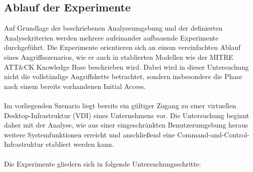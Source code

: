 \subsection{Ablauf der Experimente}
Auf Grundlage der beschriebenen Analyseumgebung und der definierten Analysekriterien werden mehrere aufeinander aufbauende Experimente durchgeführt. 
Die Experimente orientieren sich an einem vereinfachten Ablauf eines Angriffsszenarios, wie er auch in etablierten Modellen wie der MITRE ATT\&CK Knowledge Base beschrieben wird. 
Dabei wird in dieser Untersuchung nicht die vollständige Angriffskette betrachtet, sondern insbesondere die Phase nach einem bereits vorhandenen Initial Access.
\\\\
Im vorliegenden Szenario liegt bereits ein gültiger Zugang zu einer virtuellen Desktop-Infrastruktur (VDI) eines Unternehmens vor. 
Die Untersuchung beginnt daher mit der Analyse, wie aus einer eingeschränkten Benutzerumgebung heraus weitere Systemfunktionen erreicht und anschließend eine Command-and-Control-Infrastruktur etabliert werden kann.
\\\\
Die Experimente gliedern sich in folgende Untersuchungsschritte:
